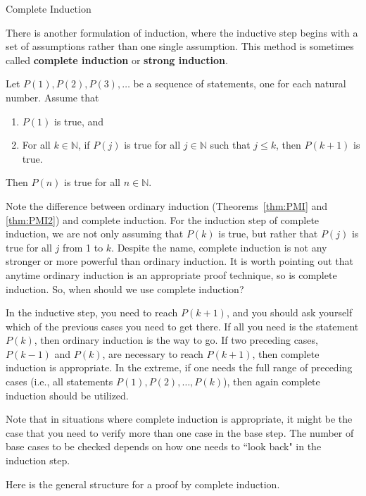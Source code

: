 \begin{section}{Complete Induction}\label{sec:CompleteInduction}

There is another formulation of induction, where the inductive step begins with a set of assumptions rather than one single assumption.  This method is sometimes called \textbf{complete induction} or \textbf{strong induction}.  

\begin{theorem}
Let $P(1), P(2), P(3), \ldots$ be a sequence of statements, one for each natural number.  Assume that
\begin{enumerate}[label=\textrm{(\roman*)}]
\item $P(1)$ is true, and
\item For all $k \in \mathbb{N}$, if $P(j)$ is true for all $j\in \mathbb{N}$ such that $j \leq k$, then $P(k+1)$ is true.  
\end{enumerate}
Then $P(n)$ is true for all $n\in\mathbb{N}$.
\end{theorem}

Note the difference between ordinary induction (Theorems~\ref{thm:PMI} and \ref{thm:PMI2}) and complete induction. For the induction step of complete induction, we are not only assuming that $P(k)$ is true, but rather that $P(j)$ is true for all $j$ from 1 to $k$.  Despite the name, complete induction is not any stronger or more powerful than ordinary induction.  It is worth pointing out that anytime ordinary induction is an appropriate proof technique, so is complete induction. So, when should we use complete induction?

In the inductive step, you need to reach $P(k+1)$, and you should ask yourself which of the previous cases you need to get there. If all you need is the statement $P(k)$, then ordinary induction is the way to go. If two preceding cases, $P(k - 1)$ and $P(k)$, are necessary to reach $P(k + 1)$, then complete induction is appropriate. In the extreme, if one needs the full range of preceding cases (i.e., all statements $P(1), P(2),\ldots,P(k)$), then again complete induction should be utilized.

Note that in situations where complete induction is appropriate, it might be the case that you need to verify more than one case in the base step. The number of base cases to be checked depends on how one needs to ``look back" in the induction step.

\begin{skeleton}
Here is the general structure for a proof by complete induction.


\end{skeleton}
\end{section}
